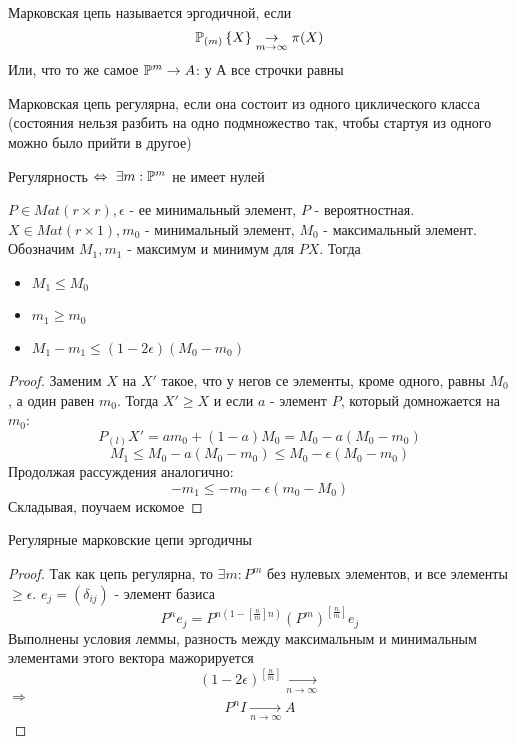 \begin{definition}
	Марковская цепь называется эргодичной, если $$ \mathbb{P}_{(m)}\left\{ X \right\} \underset{m \to \infty}{\to} \pi(X) $$
	Или, что то же самое $ \mathbb{P}^m \to A $: у А все строчки равны
\end{definition}

\begin{definition}
	Марковская цепь регулярна, если она состоит из одного циклического класса (состояния нельзя разбить на одно подмножество так, чтобы стартуя из одного можно было прийти в другое)
\end{definition}

\begin{remark}
	Регулярность $\Leftrightarrow \ \exists m : \mathbb{P}^m$ не имеет нулей
\end{remark}

\begin{lem}
	$ P \in Mat(r\times r), \epsilon $ - ее минимальный элемент, $P$ - вероятностная. $X \in Mat(r \times 1), m_0$ - минимальный элемент, $M_0$ - максимальный элемент. Обозначим $M_1, m_1$ - максимум и минимум для $PX$. Тогда
	\begin{itemize}
		\item $M_1 \leq M_0$
		\item $m_1 \geq m_0$
		\item $M_1 - m_1 \leq (1-2\epsilon)(M_0-m_0)$
	\end{itemize}

	\begin{proof}
		Заменим $X$ на $X'$ такое, что у негов се элементы, кроме одного, равны $M_0$, а один равен $m_0$. Тогда $X' \geq X$ и если $a$ - элемент $P$, который домножается на $m_0$:
		$$ P_{(l)}X' = a m_0 + (1-a) M_0 = M_0 - a(M_0-m_0)$$
		$$ M_1 \leq M_0 - a(M_0-m_0) \leq M_0 - \epsilon(M_0-m_0)$$
		Продолжая рассуждения аналогично: $$ -m_1 \leq -m_0 - \epsilon(m_0-M_0) $$
		Складывая, поучаем искомое
	\end{proof}
\end{lem}

\begin{theorem}
	Регулярные марковские цепи эргодичны \\
	\begin{proof}
		Так как цепь регулярна, то $\exists m: P^m$ без нулевых элементов, и все элементы $\geq \epsilon$. 
		$ e_j = (\delta_{ij}) $ - элемент базиса \\
		$$ P^n e_j = P^{n(1-[\frac{n}{m}]n)}(P^m)^{[\frac{n}{m}]} e_j$$
		Выполнены условия леммы, разность между максимальным и минимальным элементами этого вектора мажорируется $$ (1-2\epsilon)^{[\frac{n}{m}]} \underset{n \to \infty}{\to} $$
		$\Rightarrow$ $$ P^n I \underset{n \to \infty}{\to} A $$
	\end{proof}
\end{theorem}

